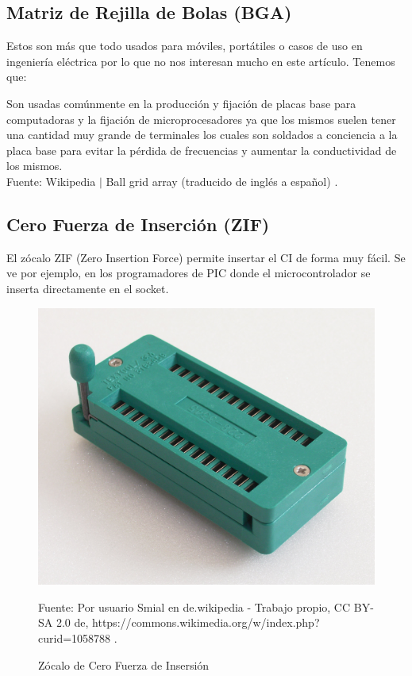 \documentclass[conference]{IEEEtran}
\begin{document}
\subsection{Matriz de Rejilla de Bolas (BGA)}

Estos son más que todo usados para móviles, portátiles o casos de uso en ingeniería eléctrica \cite{wikipedia-bga-2021B} por lo que no nos interesan mucho en este artículo. Tenemos que:

\begin{displayquote}
    Son usadas comúnmente en la producción y fijación de placas base para computadoras y la fijación de microprocesadores ya que los mismos suelen tener una cantidad muy grande de terminales los cuales son soldados a conciencia a la placa base para evitar la pérdida de frecuencias y aumentar la conductividad de los mismos.\\
    \small
    Fuente: Wikipedia $\mid$ Ball grid array (traducido de inglés a español) \cite{wikipedia-bga-2021B}.
\end{displayquote}

\subsection{Cero Fuerza de Inserción (ZIF)}

El zócalo ZIF (Zero Insertion Force) permite insertar el CI de forma muy fácil. Se ve por ejemplo, en los programadores de PIC donde el microcontrolador se inserta directamente en el socket.

\begin{figure}[H]
    \centering
    \includegraphics[width=0.2\paperwidth]{images/zif-socket.jpg}
    \caption{Zócalo de Cero Fuerza de Insersión} \footnotesize
    Fuente: Por usuario Smial en de.wikipedia - Trabajo propio, CC BY-SA 2.0 de, https://commons.wikimedia.org/w/index.php?curid=1058788 \cite{wikipedia-zif-2021}.
\end{figure}
\end{document}
